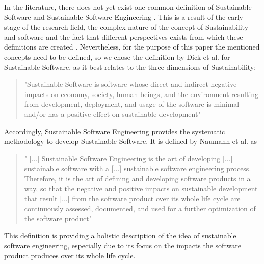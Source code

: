 \documentclass[oribibl]{llncs}
\begin{document}
In the literature, there does not yet exist one common definition of Sustainable Software and Sustainable Software Engineering \cite{venters_software_2014}. This is a result of the early stage of the research field, the complex nature of the concept of Sustainability and software and the fact that different perspectives exists from which these definitions are created \cite{venters_software_2014}. Nevertheless, for the purpose of this paper the mentioned concepts need to be defined, so we %
chose the definition by Dick et al. \cite{dick_model_2010} for Sustainable Software, as it best relates to the three dimensions of Sustainability: %
\begin{quote}
	"Sustainable Software is software whose direct and indirect negative impacts on economy, society, human beings, and the environment resulting from development, deployment, and usage of the software is minimal and/or has a positive effect on sustainable development" \cite{dick_model_2010}
\end{quote}
Accordingly, Sustainable Software Engineering provides the systematic methodology to develop Sustainable Software. It is defined by Naumann et al. as
\begin{quote}
	" [...] Sustainable Software Engineering is the art of developing [...] sustainable software with a [...] sustainable software engineering process. Therefore, it is the art of defining and developing software products in a way, so that the negative and positive impacts on sustainable development that result [...] from the software product over its whole life cycle are continuously assessed, documented, and used for a further optimization of the software product" \cite{naumann_greensoft_2011} %
\end{quote}
This definition is providing a holistic description of the idea of sustainable software engineering, especially due to its focus on the impacts the software product produces over its whole life cycle.\\ %
\end{document}

